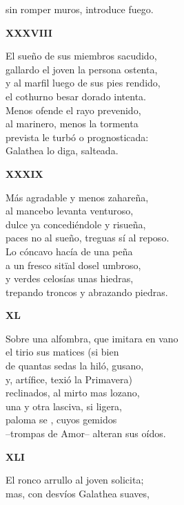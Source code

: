 \documentclass[11pt,twoside]{article}
\newcommand{\ch}{\emph{\textbf{Ch}}}
\newcommand{\guno}{\textbf{\emph{G}\textsuperscript{1}}}
\begin{document}
sin romper muros, introduce fuego.\par\poend 
%
\begin{center}
	\textbf{XXXVIII}
\end{center}\postart
El sueño de sus miembros sacudido,\\
gallardo el joven la persona ostenta,\\
y al marfil luego de sus pies rendido,\\
el cothurno besar dorado intenta.\\
Menos ofende el rayo prevenido,\\
al marinero, menos la tormenta\\
prevista le turbó o prognosticada:\\
Galathea lo diga, salteada.\par\poend
\repage
%
\begin{center}
	\textbf{XXXIX}
\end{center}\postart
Más agradable y menos zahareña,\\
al mancebo levanta venturoso,\\
dulce ya concediéndole y risueña,\\
paces no al sueño, treguas sí al reposo.\\
Lo cóncavo hacía de una peña\\
a un fresco sitïal dosel umbroso,\\
y verdes celosías unas hiedras,\\
trepando troncos y abrazando piedras.\par\poend
%
\begin{center}
	\textbf{XL}
\end{center}\postart
Sobre una alfombra, que imitara en vano\\
el tirio sus matices (si bien \footA{era}{ora {\ch}}\\
de quantas sedas la hiló, gusano,\\
y, artífice, texió la Primavera)\\
reclinados, al mirto mas lozano,\\
una y otra lasciva, si ligera,\\
paloma se \footA{caló}{callo {\guno}}, cuyos gemidos\\
--trompas de Amor-- alteran sus oídos.\par\poend
%
\begin{center}
	\textbf{XLI}
\end{center}\postart
El ronco arrullo al joven solicita;\\
mas, con desvíos Galathea suaves,\\
\end{document}
